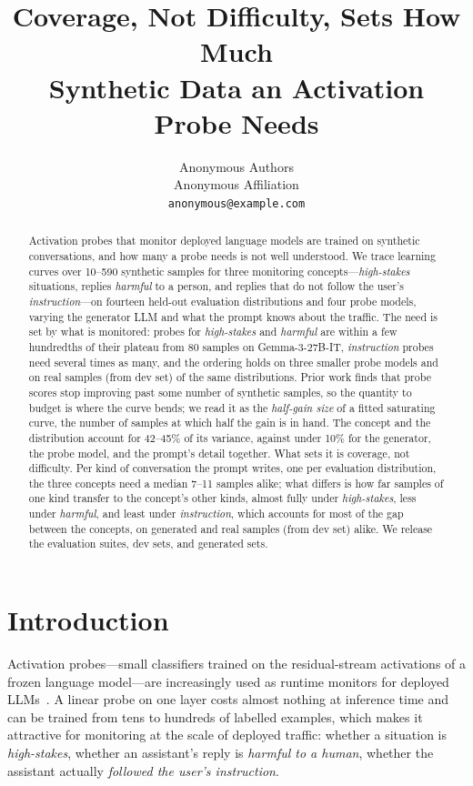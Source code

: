 \documentclass{article} %
\title{Coverage, Not Difficulty, Sets How Much\\ Synthetic Data an Activation Probe Needs}
\author{Anonymous Authors\\
Anonymous Affiliation\\
\texttt{anonymous@example.com}
}
\newcommand{\hs}{\emph{high-stakes}}
\newcommand{\harm}{\emph{harmful}}
\newcommand{\instr}{\emph{instruction}}
\begin{document}
\maketitle

\begin{abstract}
Activation probes that monitor deployed language models are trained on
synthetic conversations, and how many a probe needs is not well understood. We trace learning curves over 10--590 synthetic samples for
three monitoring concepts---\hs{} situations, replies \harm{} to a person, and
replies that do not follow the user's \instr{}---on fourteen held-out evaluation
distributions and four probe models, varying the generator LLM and what the prompt
knows about the traffic. The need is set by what is monitored: probes for \hs{}
and \harm{} are within a few hundredths of their plateau from 80 samples on
Gemma-3-27B-IT, \instr{} probes need several times as many, and the ordering holds
on three smaller probe models and on real samples (from dev set) of the same
distributions. Prior work finds that probe scores stop improving past some number of synthetic
samples, so the quantity to budget is where the curve bends; we read it as the
\emph{half-gain size} of a fitted saturating curve, the number of samples at
which half the gain is in hand. The concept and the distribution account for
42--45\% of its variance, against under 10\% for the generator, the probe
model, and the prompt's detail together. What sets it is coverage, not
difficulty. Per kind of conversation the prompt writes, one per evaluation
distribution, the three concepts need a median 7--11 samples alike; what differs is
how far samples of one kind transfer to the concept's other kinds, almost fully
under \hs{}, less under \harm{}, and least under \instr{}, which accounts for
most of the gap between the concepts, on generated and real samples (from dev set)
alike. We release the evaluation suites, dev sets, and generated sets.
\end{abstract}

\section{Introduction}
\label{sec:intro}

Activation probes---small classifiers trained on the residual-stream activations of a frozen language model---are increasingly used as runtime monitors for deployed LLMs~\citep{mckenzie2025highstakes,goldowskydill2025deception,kramar2026production}. A linear probe on one layer costs almost nothing at inference time and can be trained from tens to hundreds of labelled examples, which makes it attractive for monitoring at the scale of deployed traffic: whether a situation is \emph{high-stakes}, whether an assistant's reply is \emph{harmful to a human}, whether the assistant actually \emph{followed the user's instruction}.
\end{document}
